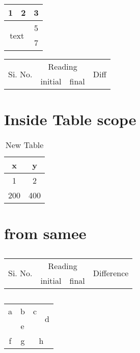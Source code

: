 \documentclass{article}
\begin{document}
\begin{tabular}{|c c | c |}
    \hline
     1 & 2 & 3 \\
     \hline
     \multicolumn{2}{|c|}{\multirow{2}{*}{text}} & 5  \\
     \multicolumn{2}{|c|}{} & 7 \\
     \hline
\end{tabular}

\begin{tabular}{|c|c|c|c|}
\hline
\multicolumn{1}{|c|}{\multirow{2}{*}{Si. No.}} & \multicolumn{2}{c}{Reading} & \multicolumn{1}{|c|}{\multirow{2}{*}{Diff}} \\
\cline{2-3}
 & initial & final & \\
 \hline
\end{tabular}


\section{Inside Table scope}

\begin{table}[tbp]  %
    \centering
    \begin{tabular}{|c c|}
        \hline
        x & y \\
        \hline
        1 & 2 \\
        200 & 400 \\
        \hline
    \end{tabular}
    \caption{New Table}
    \label{tab:my_label}
\end{table}


\section{from samee}

\subsection{}
\begin{tabular}{| c|c | c | c|}
\hline
     \multirow{2}{*}{Si. No.} & \multicolumn{2}{c|}{Reading} & \multirow{2}{*}{Difference}   \\
     \cline{2-3}
   & initial & final &  \\
\hline
\end{tabular}

\subsection{}
\begin{tabular}{| c|c | c | c|}
\hline
    a & b & c & \multirow{2}{*}{d} \\
    \cline{1-3}
    \multicolumn{3}{|c|}{e} & \\
    \hline
    f & g & \multicolumn{2}{c|}{h} \\
    \hline
\end{tabular}
\end{document}
